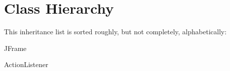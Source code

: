 \section{Class Hierarchy}
This inheritance list is sorted roughly, but not completely, alphabetically\+:\begin{DoxyCompactList}
\item {}
\begin{DoxyCompactList}
\item {}
\end{DoxyCompactList}
\item {}
\item J\+Frame\begin{DoxyCompactList}
\item {}
\end{DoxyCompactList}
\item Action\+Listener\begin{DoxyCompactList}
\item {}
\end{DoxyCompactList}
\end{DoxyCompactList}
